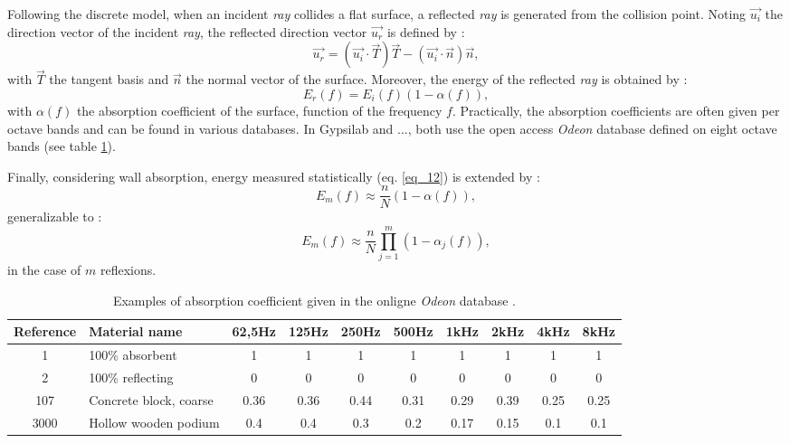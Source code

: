 \documentclass[AMA,STIX1COL]{WileyNJD-v2}
\begin{document}
Following the discrete model, when an incident \textit{ray} collides a flat surface, a reflected \textit{ray} is generated from the collision point. Noting $\overrightarrow{u_i}$ the direction vector of the incident  \textit{ray}, the reflected direction vector $\overrightarrow{u_r}$ is defined by :
\begin{equation}
\label{eq_15}
\overrightarrow{u_r} = (\overrightarrow{u_i} \cdot \overrightarrow{T})\overrightarrow{T} - (\overrightarrow{u_i} \cdot \overrightarrow{n})\overrightarrow{n},
\end{equation}
with $\overrightarrow{T}$ the tangent basis and $\overrightarrow{n}$ the normal vector of the surface. Moreover, the energy of the reflected \textit{ray} is obtained by :
\begin{equation}
E_r(f) = E_i(f)(1 - \alpha(f)),
\end{equation}
with $\alpha(f)$  the absorption coefficient of the surface, function of the frequency $f$. Practically, the absorption coefficients are often given per octave bands and can be found in various databases. In Gypsilab and ..., both use the open access \textit{Odeon} database \cite{odeon} defined on eight octave bands (see table \ref{tab_coeff_abs}). 

Finally, considering wall absorption, energy measured statistically (eq. \ref{eq_12}) is extended by :
\begin{equation}
E_m(f) \approx  \frac{n}{N}(1 - \alpha(f)),
\end{equation}
generalizable to :
\begin{equation}
E_m(f) \approx  \frac{n}{N}\prod_{j=1}^{m}(1 - \alpha_j(f)),
\label{eq_18}
\end{equation}
in the case of $m$ reflexions.

\begin{table}[t]
\centering
	\begin{tabular}{| c | m{2.5cm} | *{8}{c|}}
		\hline
		Reference & Material name & 62,5Hz & 125Hz & 250Hz & 500Hz & 1kHz & 2kHz & 4kHz & 8kHz \\
		  \hline
		  \hline
		   1 & 100\% absorbent & 1 & 1 & 1 & 1 & 1 & 1 & 1 & 1 \\
		   \hline
		2 & 100\% reflecting & 0 & 0 & 0 & 0 & 0 & 0 & 0 & 0 \\
		   \hline
		107 & Concrete block, coarse\footnotemark & 0.36 & 0.36 & 0.44 & 0.31 & 0.29 & 0.39 & 0.25 & 0.25 \\
		   \hline
		3000 & Hollow wooden podium\footnotemark & 0.4 & 0.4 & 0.3 & 0.2 & 0.17 & 0.15 & 0.1 & 0.1 \\
	     \hline
	 \end{tabular}
	\caption{Examples of absorption coefficient given in the onligne \textit{Odeon} database \cite{odeon}.}
	 \label{tab_coeff_abs}
\end{table}
\addtocounter{footnote}{-1}
\addtocounter{footnote}{1}
\end{document}

